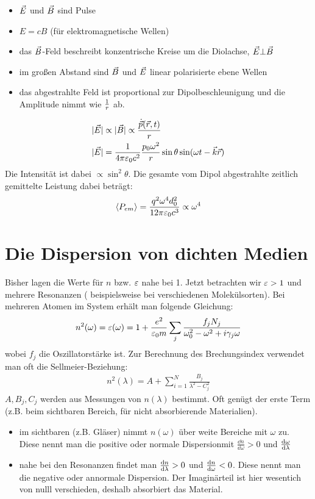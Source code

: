 \begin{itemize}
	\item $\vecE$ und $\vecB$ sind Pulse
	\item $E=cB$ (für elektromagnetische Wellen)
	\item das $\vecB$-Feld beschreibt konzentrische Kreise um die Diolachse, $\vecE\bot\vecB$
	\item im großen Abstand sind $\vecB$ und $\vecE$ linear polarisierte ebene Wellen
	\item das abgestrahlte Feld ist proportional zur Dipolbeschleunigung und die Amplitude nimmt wie $\fracone{r}$ ab.
\end{itemize}
\begin{align*}
	\vert \vecE\vert&\propto\vert\vecB\vert\propto\frac{\dot{\vecp}(\vecr,t)}{r}\\
	\vert\vecE\vert&=\fracone{4\pi\epso c^2}\frac{p_0\omega^2}{r}\sin\theta\sin(\omega t-\veck\vecr)
\end{align*}
Die Intensität ist dabei $\propto\sin^2\theta$. Die gesamte vom Dipol abgestrahlte zeitlich gemittelte Leistung dabei beträgt:
\begin{align*}
	\langle P_{em}\rangle=\frac{q^2\omega^4 d_0^2}{12\pi\epso c^3}\propto\omega^4
\end{align*}

\section{Die Dispersion von dichten Medien}
Bisher lagen die Werte für  $n$ bzw. $\eps$ nahe bei 1. Jetzt betrachten wir $\eps>1$ und mehrere Resonanzen ( beispielsweise bei verschiedenen Molekülsorten). Bei mehreren Atomen im System erhält man folgende Gleichung:
\begin{align*}
	n^2(\omega)=\eps(\omega)=1+\frac{e^2}{\epso m}\sum_{j}\frac{f_jN_j}{\omegao^2-\omega^2+i\gamma_j\omega}
\end{align*} 
wobei $f_j$ die Oszillatorstärke ist. Zur Berechnung des Brechungsindex verwendet man oft die Sellmeier-Beziehung:
\begin{align*}
	n^2(\lambda)=A+\sum_{i=1}^{N}\frac{B_j}{\lambda^2-C_j^2}
\end{align*}
$A, B_j, C_j$ werden aus Messungen von $n(\lambda)$ bestimmt. Oft genügt der erste Term (z.B. beim sichtbaren Bereich, für nicht absorbierende Materialien).
\begin{itemize}
	\item im sichtbaren (z.B. Gläser) nimmt $n(\omega)$ über weite Bereiche mit $\omega$ zu. Diese nennt man die \glqq positive oder normale Dispersion\grqq mit $\frac{\dd n}{\dd \omega}>0$ und $\ddif[\omega]{\lambda}$
	\item nahe bei den Resonanzen findet man $\ddif[n]{\lambda}>0$ und $\ddif[n]{\omega}<0$. Diese nennt man die \glqq negative oder annormale Dispersion\grqq. Der Imaginärteil ist hier wesentich von nulll verschieden, deshalb absorbiert das Material.
\end{itemize}

